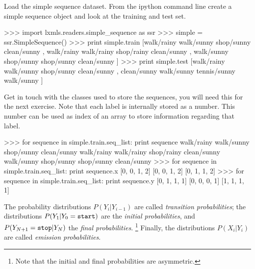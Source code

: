\begin{exercise}
Load the simple sequence dataset. 
From the ipython command line create a simple sequence object and look
at the training and test set.
\begin{python}
>>> import lxmls.readers.simple_sequence as ssr
>>> simple = ssr.SimpleSequence()
>>> print simple.train
[walk/rainy walk/sunny shop/sunny clean/sunny , walk/rainy walk/rainy shop/rainy clean/sunny , walk/sunny shop/sunny shop/sunny clean/sunny ]
>>> print simple.test
[walk/rainy walk/sunny shop/sunny clean/sunny , clean/sunny walk/sunny tennis/sunny walk/sunny ]
\end{python}
Get in touch with the classes used to store the sequences, you will need this for the next exercise. Note that each label is internally stored as a number. This number can be used as index of an array to store information regarding that label.
\begin{python}
>>> for sequence in simple.train.seq_list:
	print sequence
walk/rainy walk/sunny shop/sunny clean/sunny
walk/rainy walk/rainy shop/rainy clean/sunny
walk/sunny shop/sunny shop/sunny clean/sunny
>>> for sequence in simple.train.seq_list:
	print sequence.x
[0, 0, 1, 2]
[0, 0, 1, 2]
[0, 1, 1, 2]
>>> for sequence in simple.train.seq_list:
	print sequence.y
[0, 1, 1, 1]
[0, 0, 0, 1]
[1, 1, 1, 1]
\end{python}

\end{exercise}

The probability distributions $P(Y_{i}|Y_{i-1})$ are called \emph{transition probabilities}; the distributions 
$P(Y_{1}|Y_{0} = {\tt start})$ are the \emph{initial probabilities}, and 
$P(Y_{N+1}={\tt stop} |Y_{N})$ the \emph{final probabilities}.%
\footnote{Note that the initial and final probabilities 
are asymmetric.} %
Finally, the distributions $P(X_i|Y_i)$ are called \emph{emission probabilities}. 


